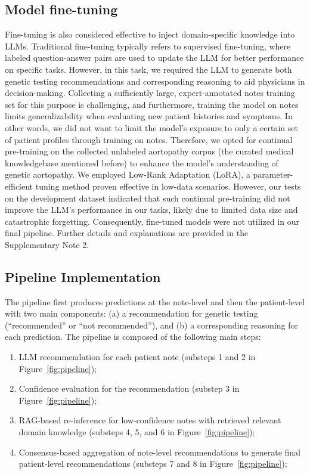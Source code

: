 \documentclass[fleqn,10pt]{wlscirep}
\begin{document}
\subsection*{Model fine-tuning}
Fine-tuning is also considered effective to inject domain-specific knowledge into LLMs.\cite{ovadia2023fine} Traditional fine-tuning typically refers to supervised fine-tuning, where labeled question-answer pairs are used to update the LLM for better performance on specific tasks. However, in this task, we required the LLM to generate both genetic testing recommendations and corresponding reasoning to aid physicians in decision-making. Collecting a sufficiently large, expert-annotated notes training set for this purpose is challenging, and furthermore, training the model on notes limits generalizability when evaluating new patient histories and symptoms. In other words, we did not want to limit the model’s exposure to only a certain set of patient profiles through training on notes. Therefore, we opted for continual pre-training on the collected unlabeled aortopathy corpus (the curated medical knowledgebase mentioned before) to enhance the model’s understanding of genetic aortopathy. We employed Low-Rank Adaptation (LoRA), a parameter-efficient tuning method proven effective in low-data scenarios.\cite{hu2022lora} However, our tests on the development dataset indicated that such continual pre-training did not improve the LLM’s performance in our tasks, likely due to limited data size and catastrophic forgetting. Consequently, fine-tuned models were not utilized in our final pipeline. Further details and explanations are provided in the Supplementary Note 2.

\subsection*{Pipeline Implementation}

The pipeline first produces predictions at the note-level and then the patient-level with two main components: (a) a recommendation for genetic testing (“recommended” or “not recommended”), and (b) a corresponding reasoning for each prediction. The pipeline is composed of the following main steps: 

\begin{enumerate}[label=(\roman*)]
    \setlength{\itemsep}{-2pt}
    \item LLM recommendation for each patient note (substeps 1 and 2 in Figure~\ref{fig:pipeline});
    \item Confidence evaluation for the recommendation (substep 3 in Figure~\ref{fig:pipeline});
    \item RAG-based re-inference for low-confidence notes with retrieved relevant domain knowledge (substeps 4, 5, and 6 in Figure~\ref{fig:pipeline});
    \item Consensus-based aggregation of note-level recommendations to generate final patient-level recommendations (substeps 7 and 8 in Figure~\ref{fig:pipeline});
\end{enumerate}
\end{document}
